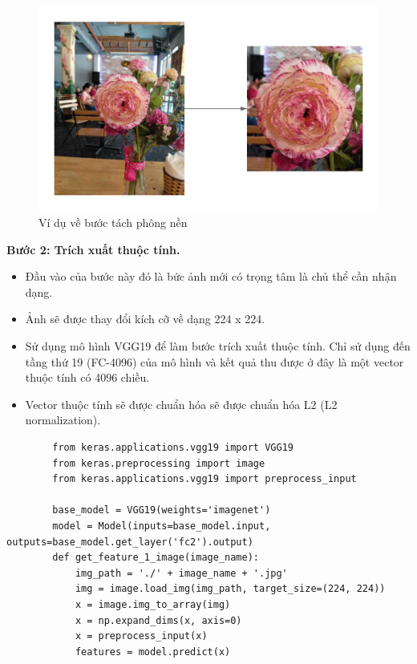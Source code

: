 \documentclass[12pt]{report}
\begin{document}
		\begin{figure}[h]
			\centering
			\includegraphics[scale=0.3]{tach_phong_nen}
			\caption{Ví dụ về bước tách phông nền}		
			\label{fig:tach_phong_nen}
		\end{figure}
														
		\textbf{Bước 2: Trích xuất thuộc tính.} 
		\begin{itemize}
			\item Đầu vào của bước này đó là bức ảnh mới có trọng tâm là chủ thể cần nhận dạng.
			\item Ảnh sẽ được thay đổi kích cỡ về dạng 224 x 224.
			\item Sử dụng mô hình VGG19 \cite{cia_vgg19} để làm bước trích xuất thuộc tính. Chỉ sử dụng đến tầng thứ 19 (FC-4096) của mô hình và kết quả thu được ở đây là một vector thuộc tính có 4096 chiều.
			\item Vector thuộc tính sẽ được chuẩn hóa sẽ được chuẩn hóa L2 (L2 normalization).
		\end{itemize}
														
														
		\begin{lstlisting}
		from keras.applications.vgg19 import VGG19
		from keras.preprocessing import image
		from keras.applications.vgg19 import preprocess_input

		base_model = VGG19(weights='imagenet')
		model = Model(inputs=base_model.input,   outputs=base_model.get_layer('fc2').output)
		def get_feature_1_image(image_name):
			img_path = './' + image_name + '.jpg'
			img = image.load_img(img_path, target_size=(224, 224))
			x = image.img_to_array(img)
			x = np.expand_dims(x, axis=0)
			x = preprocess_input(x)
			features = model.predict(x)
		\end{lstlisting}
												
\end{document}
